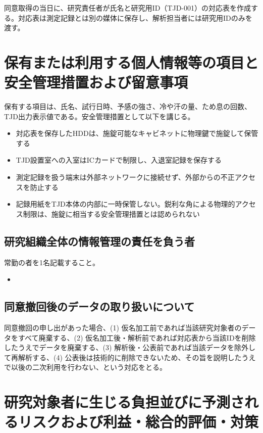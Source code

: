 \documentclass{kyodai-protocol}
\begin{document}
同意取得の当日に、研究責任者が氏名と研究用ID（TJD-001）の対応表を作成する。対応表は測定記録とは別の媒体に保存し、解析担当者には研究用IDのみを渡す。

\section{保有または利用する個人情報等の項目と安全管理措置および留意事項}

保有する項目は、氏名、試行日時、予感の強さ、冷や汗の量、ため息の回数、TJD出力表示値である。安全管理措置として以下を講じる。

\begin{itemize}
\item 対応表を保存したHDDは、施錠可能なキャビネットに物理鍵で施錠して保管する
\item TJD設置室への入室はICカードで制限し、入退室記録を保存する
\item 測定記録を扱う端末は外部ネットワークに接続せず、外部からの不正アクセスを防止する
\item 記録用紙をTJD本体の内部に一時保管しない。鋭利な角による物理的アクセス制限は、施錠に相当する安全管理措置とは認められない
\end{itemize}

\subsection{研究組織全体の情報管理の責任を負う者}

常勤の者を1名記載すること。

\begin{itemize}
\item %
\end{itemize}

\subsection{同意撤回後のデータの取り扱いについて}

同意撤回の申し出があった場合、(1) 仮名加工前であれば当該研究対象者のデータをすべて廃棄する、(2) 仮名加工後・解析前であれば対応表から当該IDを削除したうえでデータを廃棄する、(3) 解析後・公表前であれば当該データを除外して再解析する、(4) 公表後は技術的に削除できないため、その旨を説明したうえで以後の二次利用を行わない、という対応をとる。

\section{研究対象者に生じる負担並びに予測されるリスクおよび利益・総合的評価・対策}
\label{sec:risk-benefit}
\end{document}
